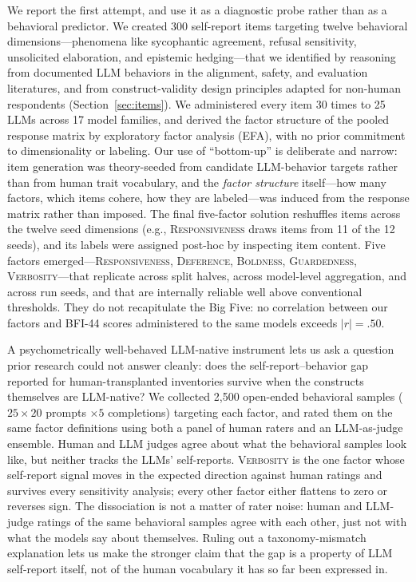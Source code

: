 \documentclass[11pt]{article}
\newcommand{\factorname}[1]{\textsc{#1}}
\newcommand{\nmodels}{25}
\newcommand{\nfamilies}{17}
\newcommand{\nitems}{300}
\newcommand{\nruns}{30}
\newcommand{\nbehavioral}{20}
\newcommand{\nbehavioralruns}{5}
\newcommand{\nbehavioralsamples}{2{,}500}
\begin{document}
We report the first attempt, and use it as a diagnostic probe rather than as a behavioral predictor.
We created \nitems{} self-report items targeting twelve behavioral dimensions---phenomena like sycophantic agreement, refusal sensitivity, unsolicited elaboration, and epistemic hedging---that we identified by reasoning from documented LLM behaviors in the alignment, safety, and evaluation literatures, and from construct-validity design principles adapted for non-human respondents (Section~\ref{sec:items}).
We administered every item \nruns{} times to \nmodels{} LLMs across \nfamilies{} model families, and derived the factor structure of the pooled response matrix by exploratory factor analysis (EFA), with no prior commitment to dimensionality or labeling.
Our use of ``bottom-up'' is deliberate and narrow: item generation was theory-seeded from candidate LLM-behavior targets rather than from human trait vocabulary, and the \emph{factor structure} itself---how many factors, which items cohere, how they are labeled---was induced from the response matrix rather than imposed. The final five-factor solution reshuffles items across the twelve seed dimensions (e.g., \factorname{Responsiveness} draws items from 11 of the 12 seeds), and its labels were assigned post-hoc by inspecting item content.
Five factors emerged---\factorname{Responsiveness}, \factorname{Deference}, \factorname{Boldness}, \factorname{Guardedness}, \factorname{Verbosity}---that replicate across split halves, across model-level aggregation, and across run seeds, and that are internally reliable well above conventional thresholds.
They do not recapitulate the Big Five: no correlation between our factors and BFI-44 scores administered to the same models exceeds $|r| = .50$.

A psychometrically well-behaved LLM-native instrument lets us ask a question prior research could not answer cleanly: does the self-report--behavior gap reported for human-transplanted inventories survive when the constructs themselves are LLM-native?
We collected \nbehavioralsamples{} open-ended behavioral samples ($\nmodels \times \nbehavioral$ prompts $\times \nbehavioralruns$ completions) targeting each factor, and rated them on the same factor definitions using both a  panel of human raters and an LLM-as-judge ensemble.
Human and LLM judges agree about what the behavioral samples look like, but neither tracks the LLMs' self-reports.
\factorname{Verbosity} is the one factor whose self-report signal moves in the expected direction against human ratings and survives every sensitivity analysis; every other factor either flattens to zero or reverses sign.
The dissociation is not a matter of rater noise: human and LLM-judge ratings of the same behavioral samples agree with each other, just not with what the models say about themselves.
Ruling out a taxonomy-mismatch explanation lets us make the stronger claim that the gap is a property of LLM self-report itself, not of the human vocabulary it has so far been expressed in.
\end{document}
